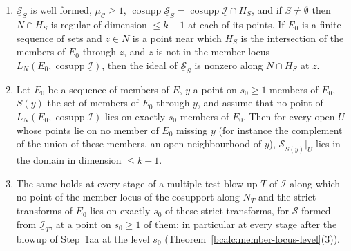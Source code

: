 \begin{proposition}
\begin{enumerate}
\item \(\underline{\mathcal S}_S\) is well formed, \(\mu_{\mathcal C}\ge1\), \(\operatorname{cosupp}\underline{\mathcal S}_S=\operatorname{cosupp}\underline{\mathcal I}\cap H_S\), and if \(S\ne\emptyset\)
then \(N\cap H_S\) is regular of dimension \(\le k-1\) at each of its points. If \(E_0\) is a finite sequence of sets and \(z\in N\) is a point near which \(H_S\) is the
intersection of the members of \(E_0\) through \(z\), and \(z\) is not in the member locus \(L_N(E_0,\operatorname{cosupp}\underline{\mathcal I})\), then the ideal of
\(\underline{\mathcal S}_S\) is nonzero along \(N\cap H_S\) at \(z\).
\item Let \(E_0\) be a sequence of members of \(E\), \(y\) a point on \(s_0\ge1\) members of \(E_0\), \(S(y)\) the set of members of \(E_0\) through \(y\), and assume that no point
of \(L_N(E_0,\operatorname{cosupp}\underline{\mathcal I})\) lies on exactly \(s_0\) members of \(E_0\). Then for every open \(U\) whose points lie on no member of \(E_0\) missing \(y\)
(for instance the complement of the union of these members, an open neighbourhood of \(y\)), \(\underline{\mathcal S}_{S(y)}|_U\) lies in the domain in dimension \(\le k-1\).
\item The same holds at every stage of a multiple test blow-up \(T\) of \(\underline{\mathcal I}\) along which no point of the member locus of the cosupport along \(N_T\) and the
strict transforms of \(E_0\) lies on exactly \(s_0\) of these strict transforms, for \(\underline{\mathcal S}\) formed from \(\underline{\mathcal I}_T\), at a point on \(s_0\ge1\) of
them; in particular at every stage after the blowup of Step~1aa at the level \(s_0\) (Theorem~\ref{bcalc:member-locus-level}(3)).
\end{enumerate}
\end{proposition}
